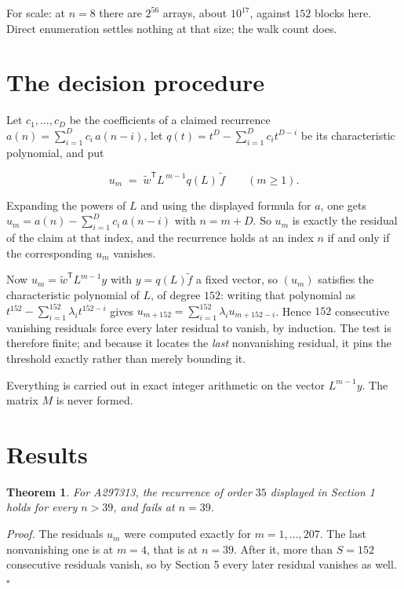 \documentclass[11pt]{article}
\newtheorem{theorem}{Theorem}
\theoremstyle{definition}
\begin{document}
For scale: at $n = 8$ there are $2^{56}$ arrays, about $10^{17}$, against $152$ blocks here. Direct enumeration settles nothing at that size; the walk count does.

\section{The decision procedure}

Let $c_1,\dots,c_D$ be the coefficients of a claimed recurrence $a(n) = \sum_{i=1}^{D} c_i\,a(n-i)$, let $q(t) = t^{D} - \sum_{i=1}^{D} c_i t^{D-i}$ be its characteristic polynomial, and put

\[u_m \;=\; \tilde w^{\mathsf T} L^{\,m-1} q(L)\,\tilde f \qquad (m \ge 1).\]

Expanding the powers of $L$ and using the displayed formula for $a$, one gets $u_m = a(n) - \sum_{i=1}^{D} c_i\,a(n-i)$ with $n = m + D$. So $u_m$ is exactly the residual of the claim at that index, and the recurrence holds at an index $n$ if and only if the corresponding $u_m$ vanishes.

Now $u_m = \tilde w^{\mathsf T} L^{m-1} y$ with $y = q(L)\tilde f$ a fixed vector, so $(u_m)$ satisfies the characteristic polynomial of $L$, of degree $152$: writing that polynomial as $t^{152} - \sum_{i=1}^{152} \lambda_i t^{152-i}$ gives $u_{m+152} = \sum_{i=1}^{152} \lambda_i u_{m+152-i}$. Hence $152$ consecutive vanishing residuals force every later residual to vanish, by induction. The test is therefore finite; and because it locates the {\itshape last} nonvanishing residual, it pins the threshold exactly rather than merely bounding it.

Everything is carried out in exact integer arithmetic on the vector $L^{m-1}y$. The matrix $M$ is never formed.

\section{Results}

\begin{theorem} For A297313, the recurrence of order $35$ displayed in Section 1 holds for every $n > 39$, and fails at $n = 39$.\end{theorem}

{\itshape Proof.} The residuals $u_m$ were computed exactly for $m = 1,\dots,207$. The last nonvanishing one is at $m = 4$, that is at $n = 39$. After it, more than $S = 152$ consecutive residuals vanish, so by Section 5 every later residual vanishes as well. $\square$
\end{document}
